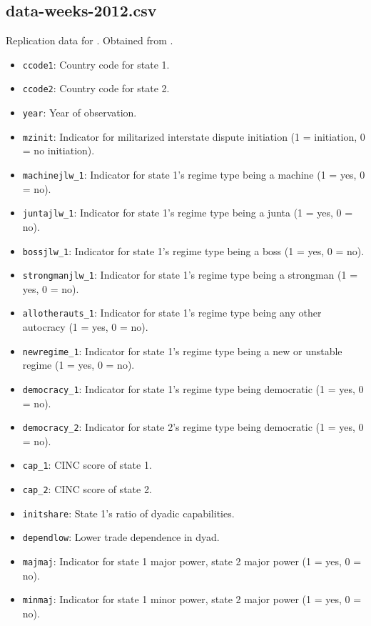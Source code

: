 \documentclass[12pt]{article}
\begin{document}
\subsection{data-weeks-2012.csv}

Replication data for \citet{Weeks:2012be}.
Obtained from \citet{weeks2012data}.

\begin{itemize}
  \item \texttt{ccode1}: Country code for state 1.
  \item \texttt{ccode2}: Country code for state 2.
  \item \texttt{year}: Year of observation.
  \item \texttt{mzinit}: Indicator for militarized interstate dispute initiation (1 = initiation, 0 = no initiation).
  \item \texttt{machinejlw\_1}: Indicator for state 1's regime type being a machine (1 = yes, 0 = no).
  \item \texttt{juntajlw\_1}: Indicator for state 1's regime type being a junta (1 = yes, 0 = no).
  \item \texttt{bossjlw\_1}: Indicator for state 1's regime type being a boss (1 = yes, 0 = no).
  \item \texttt{strongmanjlw\_1}: Indicator for state 1's regime type being a strongman (1 = yes, 0 = no).
  \item \texttt{allotherauts\_1}: Indicator for state 1's regime type being any other autocracy (1 = yes, 0 = no).
  \item \texttt{newregime\_1}: Indicator for state 1's regime type being a new or unstable regime (1 = yes, 0 = no).
  \item \texttt{democracy\_1}: Indicator for state 1's regime type being democratic (1 = yes, 0 = no).
  \item \texttt{democracy\_2}: Indicator for state 2's regime type being democratic (1 = yes, 0 = no).
  \item \texttt{cap\_1}: CINC score of state 1.
  \item \texttt{cap\_2}: CINC score of state 2. 
  \item \texttt{initshare}: State 1's ratio of dyadic capabilities.
  \item \texttt{dependlow}: Lower trade dependence in dyad.
  \item \texttt{majmaj}: Indicator for state 1 major power, state 2 major power (1 = yes, 0 = no).
  \item \texttt{minmaj}: Indicator for state 1 minor power, state 2 major power (1 = yes, 0 = no).

\end{itemize}
\end{document}

